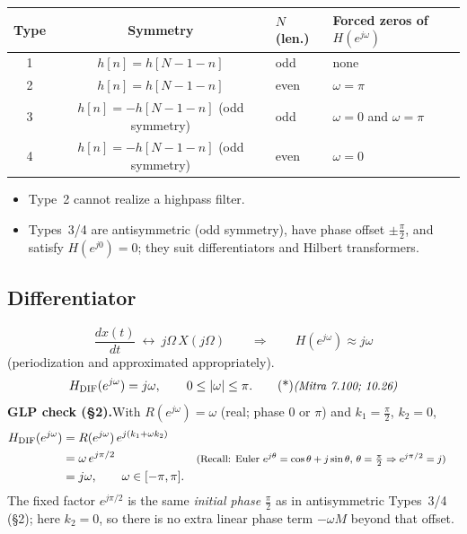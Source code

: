 \documentclass[handout_subfiles_root.tex]{subfiles}
\begin{document}
\begin{notebox}[title=\HandoutNoteAddendumTitle]
\begin{center}
\footnotesize
\setlength{\tabcolsep}{5pt}
\renewcommand{\arraystretch}{1.25}
\begin{tabular}{@{}ccll@{}}
\toprule
Type & Symmetry & $N$ (len.) & Forced zeros of $H(e^{j\omega})$ \\
\midrule
1 & $h[n]=h[N-1-n]$ & odd & none \\
2 & $h[n]=h[N-1-n]$ & even & $\omega=\pi$ \\
3 & $h[n]=-h[N-1-n]$ (odd symmetry) & odd & $\omega=0$ and $\omega=\pi$ \\
4 & $h[n]=-h[N-1-n]$ (odd symmetry) & even & $\omega=0$ \\
\bottomrule
\end{tabular}
\end{center}
\begin{itemize}
  \item Type~2 cannot realize a highpass filter.
  \item Types~3/4 are antisymmetric (odd symmetry), have phase offset
  $\pm\frac{\pi}{2}$, and satisfy $H(e^{j0})=0$; they suit differentiators
  and Hilbert transformers.
\end{itemize}
\end{notebox}


\subsection{Differentiator}
\begin{equation*}
\frac{dx(t)}{dt} \ \longleftrightarrow\ j\Omega\,X(j\Omega)
\qquad\Longrightarrow\qquad
H(e^{j\omega}) \approx j\omega
\end{equation*}
(periodization and approximated appropriately).
\begin{equation*}
H_{\mathrm{DIF}}(e^{j\omega}) = j\omega, \qquad 0 \le |\omega| \le \pi. \MitraTag{7.100; 10.26}
\end{equation*}
\noindent\textbf{GLP check (§2).}\quad With $R(e^{j\omega})=\omega$ (real; phase $0$ or $\pi$) and $k_1=\frac{\pi}{2}$, $k_2=0$,
\begin{align*}
H_{\mathrm{DIF}}(e^{j\omega})
&= R(e^{j\omega})\,e^{j(k_1+\omega k_2)} \\
&= \omega\,e^{j\pi/2} && \text{\footnotesize (Recall: Euler $e^{j\theta}=\cos\theta+j\sin\theta$, $\theta=\tfrac{\pi}{2}\Rightarrow e^{j\pi/2}=j$)} \\
&= j\omega, \qquad \omega\in[-\pi,\pi].
\end{align*}
\noindent The fixed factor $e^{j\pi/2}$ is the same \emph{initial phase} $\frac{\pi}{2}$ as in antisymmetric Types~3/4 (§2); here $k_2=0$, so there is no extra linear phase term $-\omega M$ beyond that offset.
\end{document}
